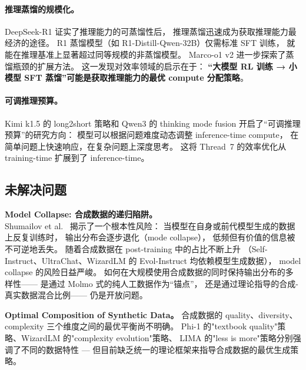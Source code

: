 \paragraph{推理蒸馏的规模化。}
DeepSeek-R1 \cite{deepseek2025r1} 证实了推理能力的可蒸馏性后，
推理蒸馏迅速成为获取推理能力最经济的途径。
R1 蒸馏模型（如 R1-Distill-Qwen-32B）仅需标准 SFT 训练，
就能在推理基准上显著超过同等规模的非蒸馏模型。
Marco-o1 v2 \cite{yin2025marcoo1v2} 进一步探索了蒸馏瓶颈的扩展方法。
这一发现对效率领域的启示在于：
\textbf{``大模型 RL 训练 → 小模型 SFT 蒸馏''可能是获取推理能力的最优 compute 分配策略}。

\paragraph{可调推理预算。}
Kimi k1.5 \cite{moonshot2025kimi} 的 long2short 策略和
Qwen3 \cite{yang2025qwen3} 的 thinking mode fusion
开启了``可调推理预算''的研究方向：
模型可以根据问题难度动态调整 inference-time compute，
在简单问题上快速响应，在复杂问题上深度思考。
这将 Thread~7 的效率优化从 training-time 扩展到了 inference-time。

\subsection{未解决问题}
\label{sec:t7-open}

\begin{openproblembox}
\textbf{Model Collapse: 合成数据的递归陷阱。}\\
Shumailov et al.\ \cite{shumailov2023modelcollapse} 揭示了一个根本性风险：
当模型在自身或前代模型生成的数据上反复训练时，
输出分布会逐步退化（mode collapse），
低频但有价值的信息被不可逆地丢失。
随着合成数据在 post-training 中的占比不断上升
（Self-Instruct、UltraChat、WizardLM 的 Evol-Instruct 均依赖模型生成数据），
model collapse 的风险日益严峻。
如何在大规模使用合成数据的同时保持输出分布的多样性——
是通过 Molmo 式的纯人工数据作为``锚点''，
还是通过理论指导的合成-真实数据混合比例——
仍是开放问题。
\end{openproblembox}

\begin{openproblembox}
\textbf{Optimal Composition of Synthetic Data。}
合成数据的 quality、diversity、complexity 三个维度之间的最优平衡尚不明确。
Phi-1 的"textbook quality"策略、WizardLM 的"complexity evolution"策略、
LIMA 的"less is more"策略分别强调了不同的数据特性 ---
但目前缺乏统一的理论框架来指导合成数据的最优生成策略。
\end{openproblembox}


